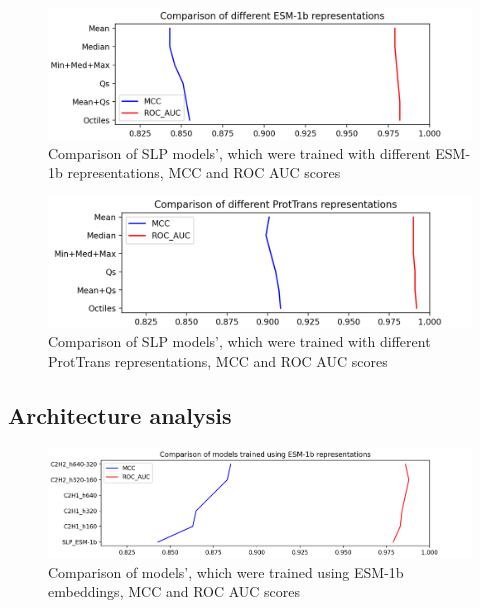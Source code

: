 \documentclass[12pt]{article}
\begin{document}
	\begin{figure}[h!]
		\centering
		\includegraphics[scale=0.7]{SLP_ESM_003_diff_representations.png}

		\caption{Comparison of SLP models', which were trained with different
		ESM-1b representations, MCC and ROC AUC scores}
		\label{figure:scoresRepresentationsESM}
	\end{figure}

	\begin{figure}[h!]
		\centering
		\includegraphics[scale=0.7]{SLP_PT_003_diff_representations.png}

		\caption{Comparison of SLP models', which were trained with different
		ProtTrans representations, MCC and ROC AUC scores}
		\label{figure:scoresRepresentationsPT}
	\end{figure}

	\newpage

	\subsection{Architecture analysis}

	\begin{figure}[h!]
		\centering
		\includegraphics[scale=0.6]{MLP_ESM.png}

		\caption{Comparison of models', which were trained using 
		ESM-1b embeddings, MCC and ROC AUC scores}
		\label{figure:scoresMLP_ESM}
	\end{figure}
\end{document}
